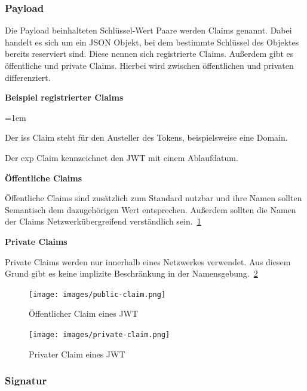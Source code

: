 \documentclass[paper=a4,fontsize=12pt,parskip=half]{scrartcl}
\begin{document}
	\subsubsection{Payload}
	\label{sec: jwt-payload}

	Die Payload beinhalteten Schlüssel-Wert Paare werden Claims genannt. Dabei handelt es sich um ein JSON Objekt, bei dem bestimmte Schlüssel des Objektes bereits reserviert sind. Diese nennen sich registrierte Claims. Außerdem gibt es öffentliche und private Claims. Hierbei wird zwischen öffentlichen und privaten differenziert.

	\noindent
	\textbf{Beispiel registrierter Claims}

	\begin{description}
		\leftskip=1em
		\item[iss]
		Der iss Claim steht für den Austeller des Tokens, beispielsweise eine Domain.
		\item[exp] Der exp Claim kennzeichnet den \gls{JWT} mit einem Ablaufdatum.
	\end{description}


	\noindent
	\textbf{Öffentliche Claims}

	Öffentliche Claims sind zusätzlich zum Standard nutzbar und ihre Namen sollten Semantisch dem dazugehörigen Wert entsprechen. Außerdem sollten die Namen der Claims Netzwerkübergreifend verständlich sein.~\ref{fig:public-claim}

	\noindent
	\textbf{Private Claims}

	Private Claims werden nur innerhalb eines Netzwerkes verwendet. Aus diesem Grund gibt es keine implizite Beschränkung in der Namensgebung.~\ref{fig:private-claim}

	\begin{figure}[h]
		\centering
		\texttt{[image: images/public-claim.png]}
		\caption{Öffentlicher Claim eines \gls{JWT} }
		\label{fig:public-claim}
	\end{figure}

	\begin{figure}[h]
		\centering
		\texttt{[image: images/private-claim.png]}
		\caption{Privater Claim eines \gls{JWT} }
		\label{fig:private-claim}
	\end{figure}

	\subsubsection{Signatur}
	\label{sec: jwt_signature}
\end{document}

